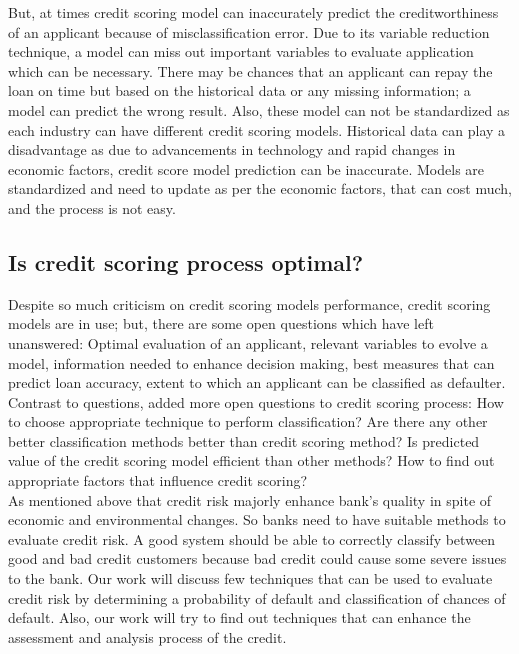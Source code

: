 {But, at times credit scoring model can inaccurately predict the creditworthiness of an applicant because of misclassification error. Due to its variable reduction technique, a model can miss out important variables to evaluate application which can be necessary. There may be chances that an applicant can repay the loan on time but based on the historical data or any missing information; a model can predict the wrong result. Also, these model can not be standardized as each industry can have different credit scoring models. Historical data can play a disadvantage as due to advancements in technology and rapid changes in economic factors, credit score model prediction can be inaccurate. Models are standardized and need to update as per the economic factors, that can cost much, and the process is not easy. 

\subsection{Is credit scoring process optimal?}\label{C.optimal}
\citep{al2002credit} Despite so much criticism on credit scoring models performance, credit scoring models are in use; but, there are some open questions which have left unanswered: Optimal evaluation of an applicant, relevant variables to evolve a model, information needed to enhance decision making, best measures that can predict loan accuracy, extent to which an applicant can be classified as defaulter.\\

Contrast to \citet{al2002credit} questions, \citet{abdou2009credit} added more open questions to credit scoring process: How to choose appropriate technique to perform classification? Are there any other better classification methods better than credit scoring method? Is predicted value of the credit scoring model efficient than other methods? How to find out appropriate factors that influence credit scoring?\\

As mentioned above that credit risk majorly enhance bank's quality in spite of economic and environmental changes. So banks need to have suitable methods to evaluate credit risk. A good system should be able to correctly classify between good and bad credit customers because bad credit could cause some severe issues to the bank. Our work will discuss few techniques that can be used to evaluate credit risk by determining a probability of default and classification of chances of default. Also, our work will try to find out techniques that can enhance the assessment and analysis process of the credit.

}
